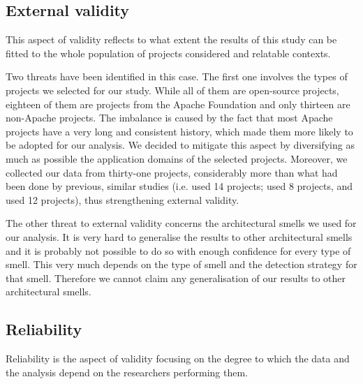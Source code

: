
\subsection{External validity}
This aspect of validity reflects to what extent the results of this study can be fitted to the whole population of projects considered and relatable contexts.

Two threats have been identified in this case.
The first one involves the types of projects we selected for our study.
While all of them are open-source projects, eighteen of them are projects from the Apache Foundation and only thirteen are non-Apache projects.
The imbalance is caused by the fact that most Apache projects have a very long and consistent history, which made them more likely to be adopted for our analysis.
We decided to mitigate this aspect by diversifying as much as possible the application domains of the selected projects.
Moreover, we collected our data from thirty-one projects, considerably more than what had been done by previous, similar studies (i.e. \cite{Le2015} used 14 projects; \cite{Le2018} used 8 projects, and \cite{Oyetoyan2015} used 12 projects), thus strengthening external validity.

The other threat to external validity concerns the architectural smells we used for our analysis.
It is very hard to generalise the results to other architectural smells and it is probably not possible to do so with enough confidence for every type of smell. This very much depends on the type of smell and the detection strategy for that smell. Therefore we cannot claim any generalisation of our results to other architectural smells.

\subsection{Reliability}
Reliability is the aspect of validity focusing on the degree to which the data and the analysis depend on the researchers performing them.


